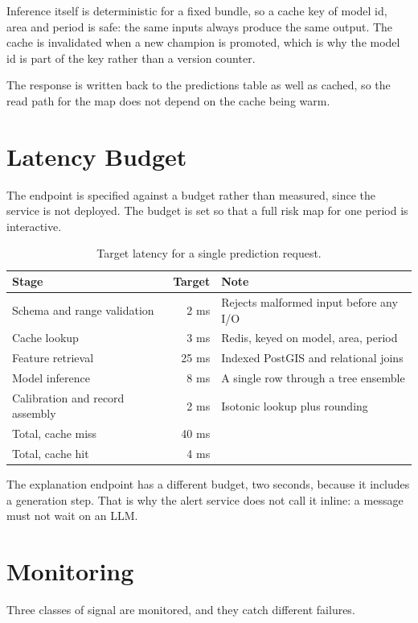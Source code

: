 \documentclass[10pt,openany]{report}
\begin{document}
Inference itself is deterministic for a fixed bundle, so a cache key of model id, area and period
is safe: the same inputs always produce the same output. The cache is invalidated when a new
champion is promoted, which is why the model id is part of the key rather than a version counter.

The response is written back to the predictions table as well as cached, so the read path for the
map does not depend on the cache being warm.

\section{Latency Budget}

The endpoint is specified against a budget rather than measured, since the service is not
deployed. The budget is set so that a full risk map for one period is interactive.

\begin{table}[htbp]
\centering
\caption{Target latency for a single prediction request.}
\label{tab:latency}
\small
\begin{tabular}{@{}lrl@{}}
\toprule
\textbf{Stage} & \textbf{Target} & \textbf{Note} \\
\midrule
Schema and range validation & 2 ms & Rejects malformed input before any I/O \\
Cache lookup & 3 ms & Redis, keyed on model, area, period \\
Feature retrieval & 25 ms & Indexed PostGIS and relational joins \\
Model inference & 8 ms & A single row through a tree ensemble \\
Calibration and record assembly & 2 ms & Isotonic lookup plus rounding \\
\midrule
Total, cache miss & 40 ms & \\
Total, cache hit & 4 ms & \\
\bottomrule
\end{tabular}
\end{table}

The explanation endpoint has a different budget, two seconds, because it includes a generation
step. That is why the alert service does not call it inline: a message must not wait on an LLM.

\section{Monitoring}

Three classes of signal are monitored, and they catch different failures.
\end{document}
